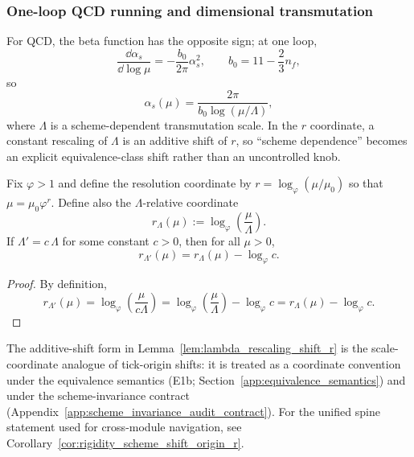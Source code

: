 \subsubsection{One-loop QCD running and dimensional transmutation}
\label{subsec:qcd_one_loop}

For QCD, the beta function has the opposite sign; at one loop,
\begin{equation}
\label{eq:qcd_one_loop}
\frac{\dd\alpha_s}{\dd\log\mu}=-\frac{b_0}{2\pi}\alpha_s^2,
\qquad
b_0=11-\frac{2}{3}n_f,
\end{equation}
so
\begin{equation}
\label{eq:qcd_solution}
\alpha_s(\mu)=\frac{2\pi}{b_0\log(\mu/\Lambda)},
\end{equation}
where $\Lambda$ is a scheme-dependent transmutation scale.
In the $r$ coordinate, a constant rescaling of $\Lambda$ is an additive shift of $r$, so ``scheme dependence'' becomes an explicit equivalence-class shift rather than an uncontrolled knob.

\begin{lemma}\label{lem:lambda_rescaling_shift_r}
\MathTag Fix $\varphi>1$ and define the resolution coordinate by $r=\log_\varphi(\mu/\mu_0)$ so that $\mu=\mu_0\varphi^r$.
Define also the $\Lambda$-relative coordinate
\[
r_\Lambda(\mu):=\log_\varphi\!\left(\frac{\mu}{\Lambda}\right).
\]
If $\Lambda' = c\,\Lambda$ for some constant $c>0$, then for all $\mu>0$,
\[
r_{\Lambda'}(\mu)=r_\Lambda(\mu)-\log_\varphi c.
\]
\end{lemma}
\begin{proof}
By definition,
\[
r_{\Lambda'}(\mu)=\log_\varphi\!\left(\frac{\mu}{c\Lambda}\right)
=\log_\varphi\!\left(\frac{\mu}{\Lambda}\right)-\log_\varphi c
=r_\Lambda(\mu)-\log_\varphi c.
\]
\end{proof}

\begin{remark}\label{rem:lambda_shift_equivalence_origin}
\AuditTag The additive-shift form in Lemma~\ref{lem:lambda_rescaling_shift_r} is the scale-coordinate analogue of tick-origin shifts:
it is treated as a coordinate convention under the equivalence semantics (E1b; Section~\ref{app:equivalence_semantics}) and under the scheme-invariance contract (Appendix~\ref{app:scheme_invariance_audit_contract}).
For the unified spine statement used for cross-module navigation, see Corollary~\ref{cor:rigidity_scheme_shift_origin_r}.
\end{remark}

